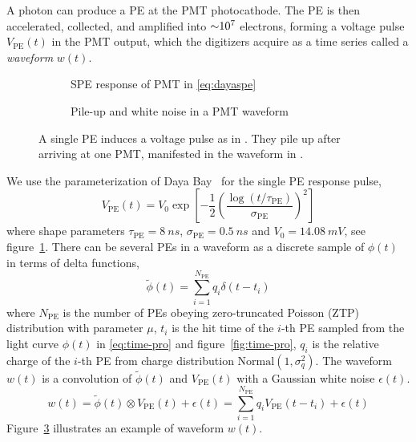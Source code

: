 A photon can produce a PE at the PMT photocathode. The PE is then accelerated, collected, and amplified into $\num[retain-unity-mantissa=false]{\sim 1e7}$ electrons, forming a voltage pulse $V_\mathrm{PE}(t)$ in the PMT output, which the digitizers acquire as a time series called a \textit{waveform} $w(t)$. 

\begin{figure}[H]
  \begin{subfigure}{.49\textwidth}
    \centering
    \resizebox{\textwidth}{!}{}
    \caption{\label{fig:spe} SPE response of PMT in \eqref{eq:dayaspe}}
  \end{subfigure}
  \begin{subfigure}{.49\textwidth}
    \centering
    \resizebox{\textwidth}{!}{}
    \caption{\label{fig:pile} Pile-up and white noise in a PMT waveform}
  \end{subfigure}
  \caption{A single PE induces a voltage pulse as in . They pile up after arriving at one PMT, manifested in the waveform in .}
\end{figure}

We use the parameterization of Daya Bay~\cite{jetter_pmt_2012} for the single PE response pulse,
\begin{equation}
  V_\mathrm{PE}(t) = V_{0}\exp\left[-\frac{1}{2}\left(\frac{\log(t/\tau_\mathrm{PE})}{\sigma_\mathrm{PE}}\right)^{2}\right]
  \label{eq:dayaspe}
\end{equation}
where shape parameters $\tau_\mathrm{PE}=\SI{8}{ns}$, $\sigma_\mathrm{PE}=\SI{0.5}{ns}$ and $V_{0}=\SI{14.08}{mV}$, see figure~\ref{fig:spe}. There can be several PEs in a waveform as a discrete sample of $\phi(t)$ in terms of delta functions,
\begin{equation}
  \label{eq:lc-sample}
  \tilde{\phi}(t) = \sum_{i=1}^{N_{\mathrm{PE}}} q_i \delta(t-t_i)
\end{equation}
where $N_\mathrm{PE}$ is the number of PEs obeying zero-truncated Poisson (ZTP) distribution with parameter $\mu$, $t_i$ is the hit time of the $i$-th PE sampled from the light curve $\phi(t)$ in \eqref{eq:time-pro} and figure~\ref{fig:time-pro}, $q_i$ is the relative charge of the $i$-th PE from charge distribution $\mathrm{Normal}(1,\sigma_{q}^2)$. The waveform $w(t)$ is a convolution of $\tilde{\phi}(t)$ and $V_\mathrm{PE}(t)$ with a Gaussian white noise $\epsilon(t)$.
\begin{equation}
  \label{eq:1}
  w(t) = \tilde{\phi}(t) \otimes V_\mathrm{PE}(t) + \epsilon(t) = \sum_{i=1}^{N_\mathrm{PE}} q_i V_\mathrm{PE}(t-t_i) + \epsilon(t)
\end{equation}
Figure~\ref{fig:pile} illustrates an example of waveform $w(t)$. 

